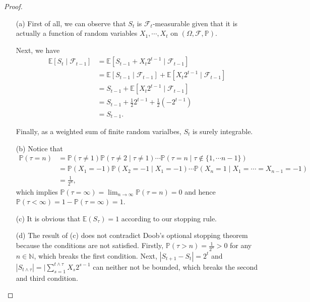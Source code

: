 \begin{proof}
    \begin{enumerate}
        \item[(a)] First of all, we can observe that $S_t$ is $\mathcal{F}_{t}$-measurable given that it is actually a function of random variables $X_1, \cdots, X_t$ on $(\Omega, \mathcal{F}, \mathbb{P})$.
        
        Next, we have
        \begin{equation*}
            \begin{aligned}
                \mathbb{E}\left[S_{t} \mid \mathcal{F}_{t-1}\right] 
                &= \mathbb{E}\left[S_{t-1} + X_t 2^{t-1}\mid \mathcal{F}_{t-1}\right]\\
                &= \mathbb{E}\left[S_{t-1} \mid \mathcal{F}_{t-1}\right] + \mathbb{E}\left[X_t 2^{t-1} \mid \mathcal{F}_{t-1}\right]\\
                &= S_{t-1} + \mathbb{E}\left[X_t 2^{t-1} \mid \mathcal{F}_{t-1}\right]\\
                &= S_{t-1} + \frac{1}{2} 2^{t-1} + \frac{1}{2} (-2^{t-1})\\
                &= S_{t-1}.
            \end{aligned}
        \end{equation*}

        Finally, as a weighted sum of finite random varialbes, $S_t$ is surely integrable.

        \item[(b)] Notice that 
        \begin{equation*}
            \begin{aligned}
                \mathbb{P}(\tau = n) 
                &= \mathbb{P}(\tau \neq 1) \mathbb{P}(\tau \neq 2 \mid \tau \neq 1) \cdots \mathbb{P}(\tau = n \mid \tau \notin \{1, \cdots n - 1\})\\
                &= \mathbb{P}(X_1 = -1) \mathbb{P}(X_2 = -1 \mid X_1 = -1) \cdots \mathbb{P}(X_n = 1 \mid X_1 = \cdots = X_{n-1} = -1)\\
                &= \frac{1}{2^n},
            \end{aligned}
        \end{equation*}
        which implies $\mathbb{P}(\tau = \infty) = \lim_{n \rightarrow \infty} \mathbb{P}(\tau = n) = 0$ and hence $\mathbb{P}(\tau < \infty) = 1 - \mathbb{P}(\tau = \infty) = 1$.

        \item[(c)] It is obvious that $\mathbb{E}(S_\tau) = 1$ according to our stopping rule.
        \item[(d)] The result of (c) does not contradict Doob's optional stopping theorem because the conditions are not satisfied.
        Firstly, $\mathbb{P}(\tau > n) = \frac{1}{2^n} > 0$ for any $n \in \mathbb{N}$, which breaks the first condition.
        Next, $|S_{t+1} - S_{t}| = 2^t$ and $|S_{t \wedge \tau}| = |\sum_{s=1}^{t \wedge \tau} X_s 2^{s-1}$ can neither not be bounded, which breaks the second and third condition.
    \end{enumerate}
\end{proof}

